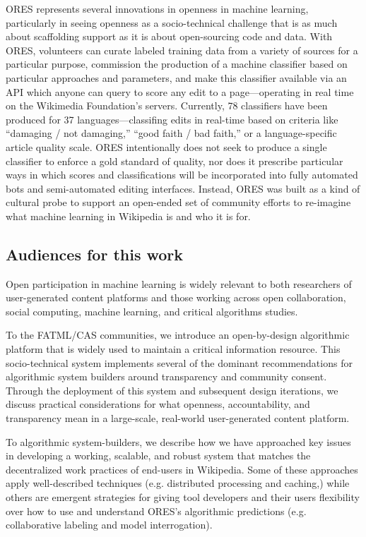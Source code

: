 ORES represents several innovations in openness in machine learning, particularly in seeing openness as a socio-technical challenge that is as much about scaffolding support as it is about open-sourcing code and data. With ORES, volunteers can curate labeled training data from a variety of sources for a particular purpose, commission the production of a machine classifier based on particular approaches and parameters, and make this classifier available via an API which anyone can query to score any edit to a page---operating in real time on the Wikimedia Foundation's servers. Currently, 78 classifiers have been produced for 37 languages---classifing edits in real-time based on criteria like ``damaging / not damaging,'' ``good faith / bad faith,'' or a language-specific article quality scale. ORES intentionally does not seek to produce a single classifier to enforce a gold standard of quality, nor does it prescribe particular ways in which scores and classifications will be incorporated into fully automated bots and semi-automated editing interfaces. Instead, ORES was built as a kind of cultural probe \cite{hutchinson2003technology} to support an open-ended set of community efforts to re-imagine what machine learning in Wikipedia is and who it is for.

\subsection{Audiences for this work}
Open participation in machine learning is widely relevant to both researchers of user-generated content platforms and those working across open collaboration, social computing, machine learning, and critical algorithms studies.

To the FATML/CAS communities, we introduce an open-by-design algorithmic platform that is widely used to maintain a critical information resource. This socio-technical system implements several of the dominant recommendations for algorithmic system builders around transparency and community consent\cite{crawford2016algorithm,diakopoulos2015algorithmic,gillespie2014relevance,tufekci2015algorithms,sandvig2014auditing}.  Through the deployment of this system and subsequent design iterations, we discuss practical considerations for what openness, accountability, and transparency mean in a large-scale, real-world user-generated content platform.

To algorithmic system-builders, we describe how we have approached key issues in developing a working, scalable, and robust system that matches the decentralized work practices of end-users in Wikipedia.  Some of these approaches apply well-described techniques (e.g. distributed processing and caching,) while others are emergent strategies for giving tool developers and their users flexibility over how to use and understand ORES's algorithmic predictions (e.g. collaborative labeling and model interrogation).

